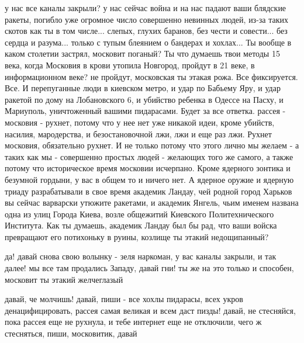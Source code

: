  
 
 
 
 

у нас все каналы закрыли? у нас сейчас война и на нас падают ваши блядские
ракеты, погибло уже огромное число совершенно невинных людей, из-за таких
скотов как ты в том числе... слепых, глухих баранов, без чести и совести... без
сердца и разума... только с тупым блеянием о бандерах и хохлах... Ты вообще в
каком столетии застрял, московит поганый? Ты что думаешь твои методы 15 века,
когда Московия в крови утопила Новгород, пройдут в 21 веке, в информационном
веке? не пройдут, московская ты этакая рожа. Все фиксируется. Все. И
перепуганные люди в киевском метро, и удар по Бабьему Яру, и удар ракетой по
дому на Лобановского 6, и убийство ребенка в Одессе на Пасху, и Мариуполь,
уничтоженный вашими пидарасами. Будет за все ответка. рассея - московия -
рухнет, потому что у нее нет уже никакой идеи, кроме убийств, насилия,
мародерства, и безостановочной лжи, лжи и еще раз лжи. Рухнет московия,
обязательно рухнет. И не только потому что этого лично мы желаем - а таких как
мы - совершенно простых людей - желающих того же самого, а также потому что
историческое время московии исчерпано. Кроме ядерного зонтика и безумной
гордыни, у вас в общем то и ничего нет. А ядерное оружие и ядерную триаду
разрабатывали в свое время академик Ландау, чей родной город Харьков вы сейчас
варварски утюжите ракетами, и академик Янгель, чьим именем названа одна из улиц
Города Киева, возле общежитий Киевского Политехнического Института. Как ты
думаешь, академик Ландау был бы рад, что ваши войска превращают его потихоньку
в руины, козлище ты этакий недощипанный?

да! давай снова свою волынку - зеля наркоман, у вас каналы закрыли, и так
далее! мы все там продались Западу, давай гни! ты же на это только и способен,
московит ты этакий желчеглазый

давай, че молчишь! давай, пиши - все хохлы пидарасы, всех укров
денацифицировать, рассея самая великая и всем даст пизды! давай, не стесняйся,
пока рассея еще не рухнула, и тебе интернет еще не отключили, чего ж
стесняться, пиши, московитик, давай


